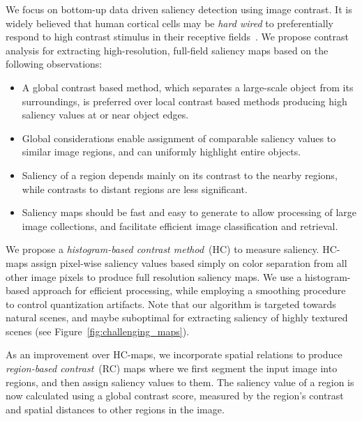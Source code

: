 \documentclass[10pt,twocolumn,letterpaper]{article}
\newcommand{\figref}[1]{Figure~\ref{#1}}
\newcommand{\HC}{HC-maps }
\begin{document}
We focus on bottom-up data driven saliency detection using image contrast.
%
It is widely believed that human cortical cells may be \emph{hard wired} to preferentially respond
to high contrast stimulus in their receptive fields~\cite{03neuron/Reynolds_attentionSaliency}.
%
We propose contrast analysis for extracting high-resolution, full-field saliency maps based on the
following observations:
\begin{itemize}
  \item A global contrast based method, which separates a large-scale object from its surroundings,
    is preferred over local contrast based methods producing high saliency values at or near object edges.
  \item Global considerations enable assignment of comparable saliency values to similar image regions,
    and can uniformly highlight entire objects.
  \item Saliency of a region depends mainly on its contrast to the nearby regions,
    while contrasts to distant regions are less significant.
  \item Saliency maps should be fast and easy to generate to allow processing of
    large image collections, and facilitate efficient image classification and retrieval.
\end{itemize}


We propose a \emph{histogram-based contrast method}~(HC) to measure saliency.
%
\HC assign pixel-wise saliency values based simply on color separation from all other image
pixels to produce full resolution saliency maps. We use a histogram-based approach for efficient processing,
while employing a smoothing procedure to control quantization artifacts.
%
Note that our algorithm is targeted towards natural scenes,
and maybe suboptimal for extracting saliency of highly textured scenes (see \figref{fig:challenging_maps}).


As an improvement over HC-maps, we incorporate spatial relations to produce
\emph{region-based contrast}~(RC) maps where we first segment the input image into
regions, and then assign saliency values to them. The saliency value of a region is
now calculated using a global contrast score, measured by the region's
contrast and spatial distances to other regions in the image.
\end{document}
